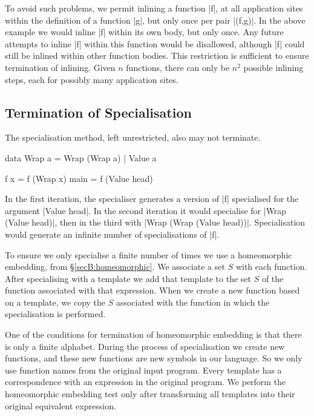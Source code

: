 To avoid such problems, we permit inlining a function |f|, at all application sites within the definition of a function |g|, but only once per pair |(f,g)|. In the above example we would inline |f| within its own body, but only once. Any future attempts to inline |f| within this function would be disallowed, although |f| could still be inlined within other function bodies. This restriction is sufficient to ensure termination of inlining. Given $n$ functions, there can only be $n^2$ possible inlining steps, each for possibly many application sites.


\subsection{Termination of Specialisation}
\label{secF:termination_specialisation}

The specialisation method, left unrestricted, also may not terminate.

\begin{example}
\label{exF:wrap}
\begin{code}
data Wrap a  =  Wrap (Wrap a)
             |  Value a

f x = f (Wrap x)
main = f (Value head)
\end{code}

In the first iteration, the specialiser generates a version of |f| specialised for the argument |Value head|. In the second iteration it would specialise for |Wrap (Value head)|, then in the third with |Wrap (Wrap (Value head))|. Specialisation would generate an infinite number of specialisations of |f|.
\end{example}

To ensure we only specialise a finite number of times we use a homeomorphic embedding, from \S\ref{secB:homeomorphic}. We associate a set $S$ with each function. After specialising with a template we add that template to the set $S$ of the function associated with that expression. When we create a new function based on a template, we copy the $S$ associated with the function in which the specialisation is performed.

One of the conditions for termination of homeomorphic embedding is that there is only a finite alphabet. During the process of specialisation we create new functions, and these new functions are new symbols in our language. So we only use function names from the original input program. Every template has a correspondence with an expression in the original program. We perform the homeomorphic embedding test only after transforming all templates into their original equivalent expression.

